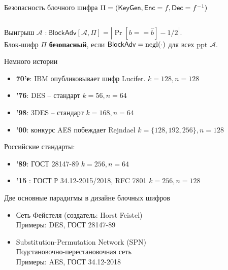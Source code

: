 \documentclass[usenames,dvipsnames,8pt,aspectratio=169]{beamer}
\begin{document}
\begin{frame}{Безопасность блочного шифра $\Pi = (\textsf{KeyGen}, \textsf{Enc} = f, \textsf{Dec} = f^{-1})$}
\begin{columns}
\begin{column}{0.5\textwidth}
		\end{column}
	\end{columns}
	 
	 \vspace{15pt}
	 \large 
	
	 Выигрыш $\mathcal{A}$ $:	\mathsf{BlockAdv} \left[  \mathcal{A}, \Pi\right ] = |\Pr[b == \hat{b}] - 1/2|$. \\[6pt]
	 Блок-шифр $\Pi$ {\color{Orange}\textbf{безопасный}}, если $	\mathsf{BlockAdv} = \mathrm{negl}(\cdot)$ для всех ppt $\mathcal{A}$.
\end{frame}

\begin{frame}{Немного истории}
\Large
\begin{itemize}
	
	\itemsep1em
	\item {\color{Orange}\textbf{70'е}:} IBM опубликовывает шифр Lucifer. $k=128, n = 128$ 
	\item {\color{Orange}\textbf{'76}:} DES -- стандарт $k=56, n = 64$
	\item {\color{Orange}\textbf{'98}:} 3DES -- стандарт  $k=168, n = 64$
	\item {\color{Orange}\textbf{'00}:} конкурс AES побеждает Rejndael $k=\{128, 192, 256\}, n = 128$
\end{itemize}

\vspace{10pt}
Российские стандарты:\\

\begin{itemize}
	
	\itemsep1em
	\item {\color{Orange}\textbf{'89}:} ГОСТ 28147-89 $k=256, n = 64$ 
	\item {\color{Orange}\textbf{'15 }:} ГОСТ Р 34.12-2015/2018, RFC 7801 $k=256, n = 128$ 
\end{itemize}
\end{frame}


\begin{frame}{Две основные парадигмы в дизайне блочных шифров}

\begin{itemize}
	\itemsep 2em
	\LARGE
	\item Сеть Фейстеля (создатель: Horst Feistel)
	\\[5pt]
	
	\Large
	Примеры: DES, ГОСТ 28147-89
	\LARGE
	\item Substitution-Permutation Network (SPN) \\ Подстановочно-перестановочная сеть  \\[5pt]
	\Large
	Примеры: AES, ГОСТ 34.12-2018
	
\end{itemize}
\end{frame}
\end{document}

